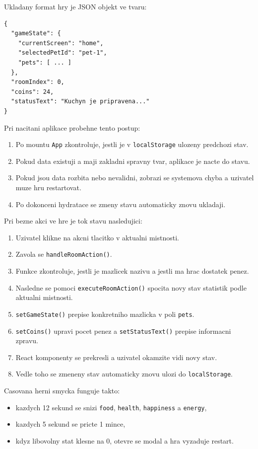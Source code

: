 \documentclass[12pt,a4paper]{article}
\begin{document}
Ukladany format hry je JSON objekt ve tvaru:

\begin{verbatim}
{
  "gameState": {
    "currentScreen": "home",
    "selectedPetId": "pet-1",
    "pets": [ ... ]
  },
  "roomIndex": 0,
  "coins": 24,
  "statusText": "Kuchyn je pripravena..."
}
\end{verbatim}

Pri nacitani aplikace probehne tento postup:
\begin{enumerate}[leftmargin=2em]
  \item Po mountu \texttt{App} zkontroluje, jestli je v \texttt{localStorage} ulozeny predchozi stav.
  \item Pokud data existuji a maji zakladni spravny tvar, aplikace je nacte do stavu.
  \item Pokud jsou data rozbita nebo nevalidni, zobrazi se systemova chyba a uzivatel muze hru restartovat.
  \item Po dokonceni hydratace se zmeny stavu automaticky znovu ukladaji.
\end{enumerate}

Pri bezne akci ve hre je tok stavu nasledujici:
\begin{enumerate}[leftmargin=2em]
  \item Uzivatel klikne na akcni tlacitko v aktualni mistnosti.
  \item Zavola se \texttt{handleRoomAction()}.
  \item Funkce zkontroluje, jestli je mazlicek nazivu a jestli ma hrac dostatek penez.
  \item Nasledne se pomoci \texttt{executeRoomAction()} spocita novy stav statistik podle aktualni mistnosti.
  \item \texttt{setGameState()} prepise konkretniho mazlicka v poli \texttt{pets}.
  \item \texttt{setCoins()} upravi pocet penez a \texttt{setStatusText()} prepise informacni zpravu.
  \item React komponenty se prekresli a uzivatel okamzite vidi novy stav.
  \item Vedle toho se zmeneny stav automaticky znovu ulozi do \texttt{localStorage}.
\end{enumerate}

Casovana herni smycka funguje takto:
\begin{itemize}[leftmargin=2em]
  \item kazdych 12 sekund se snizi \texttt{food}, \texttt{health}, \texttt{happiness} a \texttt{energy},
  \item kazdych 5 sekund se pricte 1 mince,
  \item kdyz libovolny stat klesne na 0, otevre se modal  a hra vyzaduje restart.
\end{itemize}
\end{document}

